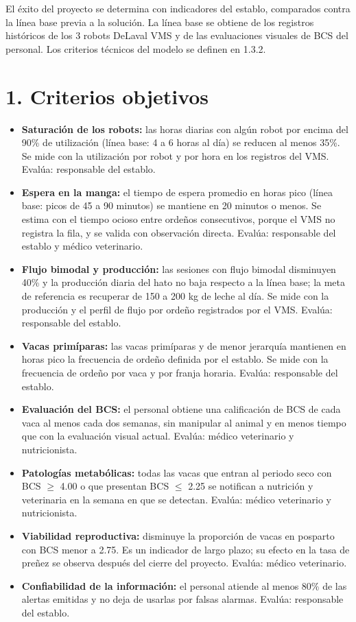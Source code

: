 \documentclass[11pt,letterpaper,DIV=12]{scrartcl}
\begin{document}


El éxito del proyecto se determina con indicadores del establo, comparados contra la línea base previa a la solución. La línea base se obtiene de los registros históricos de los 3 robots DeLaval VMS y de las evaluaciones visuales de BCS del personal. Los criterios técnicos del modelo se definen en 1.3.2.

\section{1. Criterios objetivos}

\begin{itemize}
  \item \textbf{Saturación de los robots:} las horas diarias con algún robot por encima del 90\% de utilización (línea base: 4 a 6 horas al día) se reducen al menos 35\%. Se mide con la utilización por robot y por hora en los registros del VMS. Evalúa: responsable del establo.
  \item \textbf{Espera en la manga:} el tiempo de espera promedio en horas pico (línea base: picos de 45 a 90 minutos) se mantiene en 20 minutos o menos. Se estima con el tiempo ocioso entre ordeños consecutivos, porque el VMS no registra la fila, y se valida con observación directa. Evalúa: responsable del establo y médico veterinario.
  \item \textbf{Flujo bimodal y producción:} las sesiones con flujo bimodal disminuyen 40\% y la producción diaria del hato no baja respecto a la línea base; la meta de referencia es recuperar de 150 a 200 kg de leche al día. Se mide con la producción y el perfil de flujo por ordeño registrados por el VMS. Evalúa: responsable del establo.
  \item \textbf{Vacas primíparas:} las vacas primíparas y de menor jerarquía mantienen en horas pico la frecuencia de ordeño definida por el establo. Se mide con la frecuencia de ordeño por vaca y por franja horaria. Evalúa: responsable del establo.
  \item \textbf{Evaluación del BCS:} el personal obtiene una calificación de BCS de cada vaca al menos cada dos semanas, sin manipular al animal y en menos tiempo que con la evaluación visual actual. Evalúa: médico veterinario y nutricionista.
  \item \textbf{Patologías metabólicas:} todas las vacas que entran al periodo seco con BCS $\geq$ 4.00 o que presentan BCS $\leq$ 2.25 se notifican a nutrición y veterinaria en la semana en que se detectan. Evalúa: médico veterinario y nutricionista.
  \item \textbf{Viabilidad reproductiva:} disminuye la proporción de vacas en posparto con BCS menor a 2.75. Es un indicador de largo plazo; su efecto en la tasa de preñez se observa después del cierre del proyecto. Evalúa: médico veterinario.
  \item \textbf{Confiabilidad de la información:} el personal atiende al menos 80\% de las alertas emitidas y no deja de usarlas por falsas alarmas. Evalúa: responsable del establo.
\end{itemize}
\end{document}
